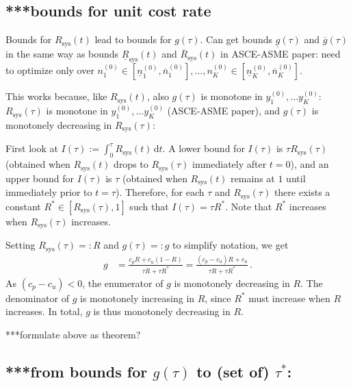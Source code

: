 \documentclass[authoryear]{elsarticle}
\newcommand{\dd}{\,\mathrm{d}}
\newcommand{\uz}{^{(0)}} %
\newcommand{\ul}[1]{\underline{#1}}
\newcommand{\ol}[1]{\overline{#1}}
\newcommand{\Rsys}{R_\text{sys}}
\newcommand{\lRsys}{\ul{R}_\text{sys}}
\newcommand{\uRsys}{\ol{R}_\text{sys}}
\newcommand{\lgt}{\ul{g}}
\newcommand{\ugt}{\ol{g}}
\newcommand{\ykzfun}[1]{y\uz_{#1}}
\newcommand{\nkzfun}[1]{n\uz_{#1}}
\newcommand{\nkzlfun}[1]{\ul{n}\uz_{#1}}
\newcommand{\nkzufun}[1]{\ol{n}\uz_{#1}}
\begin{document}
\subsection{***bounds for unit cost rate}

Bounds for $\Rsys(t)$ lead to bounds for $g(\tau)$.
Can get bounds $\lgt(\tau)$ and $\ugt(\tau)$ in the same way as bounds $\lRsys(t)$ and $\uRsys(t)$ in ASCE-ASME paper:
need to optimize only over
$\nkzfun{1} \in \left[\nkzlfun{1}, \nkzufun{1}\right], \ldots, \nkzfun{K} \in \left[\nkzlfun{K}, \nkzufun{K}\right]$.

This works because, like $\Rsys(t)$, also $g(\tau)$ is monotone in $\ykzfun{1}, \ldots \ykzfun{K}$:
$\Rsys(\tau)$ is monotone in $\ykzfun{1}, \ldots \ykzfun{K}$ (ASCE-ASME paper),
and $g(\tau)$ is monotonely decreasing in $\Rsys(\tau)$:

First look at $I(\tau) := \int_0^\tau \Rsys(t) \dd t$.
A lower bound for $I(\tau)$ is $\tau \Rsys(\tau)$ (obtained when $\Rsys(t)$ drops to $\Rsys(\tau)$ immediately after $t=0$),
and an upper bound for $I(\tau)$ is $\tau$ (obtained when $\Rsys(t)$ remains at $1$ until immediately prior to $t = \tau$).
Therefore, for each $\tau$ and $\Rsys(\tau)$ there exists a constant $R^* \in [\Rsys(\tau), 1]$
such that $I(\tau) = \tau R^*$.
Note that $R^*$ increases when $\Rsys(\tau)$ increases.

Setting $\Rsys(\tau) =: R$ and $g(\tau) =: g$ to simplify notation, we get
\begin{align*}
g &= \frac{c_p R + c_u (1-R)}{\tau R + \tau R^*}
   = \frac{(c_p - c_u) R + c_u}{\tau R + \tau R^*}\,.
\end{align*}
As $(c_p -c_u) < 0$, the enumerator of $g$ is monotonely decreasing in $R$.
The denominator of $g$ is monotonely increasing in $R$, since $R^*$ must increase when $R$ increases.
In total, $g$ is thus monotonely decreasing in $R$.

***formulate above as theorem?


\subsection{***from bounds for $g(\tau)$ to (set of) $\tau^*$:}
\end{document}
